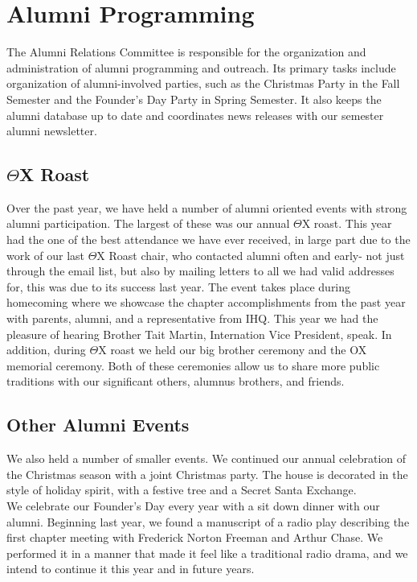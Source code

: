 \chapter{Alumni Programming}

  The Alumni Relations Committee is responsible for the organization and administration of alumni programming and outreach. Its primary tasks include organization of alumni-involved parties, such as the Christmas Party in the Fall Semester and the Founder's Day Party in Spring Semester. It also keeps the alumni database up to date and coordinates news releases with our semester alumni newsletter.

  \section*{$\Theta$X Roast}
    Over the past year, we have held a number of alumni oriented events with strong alumni participation. The largest of these was our annual $\Theta$X roast. This year had the one of the best attendance we have ever received, in large part due to the work of our last $\Theta$X Roast chair, who contacted alumni often and early- not just through the email list, but also by mailing letters to all we had valid addresses for, this was due to its success last year. The event takes place during homecoming where we showcase the chapter accomplishments from the past year with parents, alumni, and a representative from IHQ. This year we had the pleasure of hearing Brother Tait Martin, Internation Vice President, speak. In addition, during $\Theta$X roast we held our big brother ceremony and the OX memorial ceremony. Both of these ceremonies allow us to share more public traditions with our significant others, alumnus brothers, and friends.
    
  \section*{Other Alumni Events}
    We also held a number of smaller events. We continued our annual celebration of the Christmas season with a joint Christmas party. The house is decorated in the style of holiday spirit, with a festive tree and a Secret Santa Exchange. \\
    
    We celebrate our Founder’s Day every year with a sit down dinner with our alumni. Beginning last year, we found a manuscript of a radio play describing the first chapter meeting with Frederick Norton Freeman and Arthur Chase. We performed it in a manner that made it feel like a traditional radio drama, and we intend to continue it this year and in future years.
    
